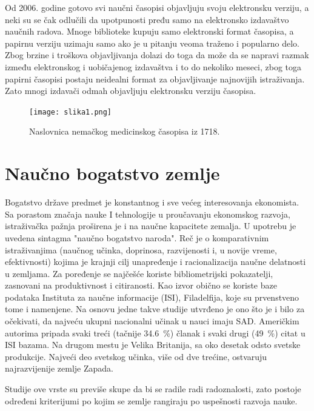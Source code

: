 \documentclass[12pt,a4paper]{article}
\begin{document}
   Od 2006. godine gotovo svi naučni časopisi objavljuju svoju elektronsku verziju, a neki su se čak odlučili da upotpunosti pređu samo na elektronsko izdavaštvo naučnih radova. Mnoge biblioteke kupuju samo elektronski format časopisa, a papirnu verziju uzimaju samo ako je u pitanju veoma traženo i popularno delo. Zbog brzine i troškova objavljivanja dolazi do toga da može da se napravi razmak između elektronskog i uobičajenog izdavaštva i to do nekoliko meseci, zbog toga papirni časopisi postaju neidealni format za objavljivanje najnovijih istraživanja. Zato mnogi izdavači odmah objavljuju elektronsku verziju časopisa. \cite{4}

\begin{figure} [h]
\centering  
\texttt{[image: slika1.png]} 
\caption{ Naslovnica nemačkog medicinskog časopisa iz 1718.}\label{slika1}
\end{figure}  
\newpage

\section{\large\textbf{Naučno bogatstvo zemlje}}
\indent 

    Bogatstvo države predmet je konstantnog i sve većeg interesovanja ekonomista. Sa porastom značaja nauke I tehnologije u proučavanju ekonomskog razvoja, istraživačka pažnja proširena je i na naučne kapacitete zemalja. U upotrebu je uvedena sintagma "naučno bogatstvo naroda". Reč je o komparativnim istraživanjima (naučnog učinka, doprinosa, razvijenosti i, u novije vreme, efektivnosti) kojima je krajnji cilj unapređenje i racionalizacija naučne delatnosti u zemljama. Za poređenje se najčešće koriste bibliometrijski pokazatelji, zasnovani na produktivnost i citiranosti. Kao izvor obično se koriste baze podataka Instituta za naučne informacije (ISI), Filadelfija, koje su prvenstveno tome i namenjene. Na osnovu jedne takve studije utvrđeno je ono što je i bilo za očekivati, da najveću ukupni nacionalni učinak u nauci imaju SAD. Američkim autorima pripada svaki treći (tačnije \SI{34.6}{\percent}) članak i svaki drugi (\SI{49}{\percent}) citat u ISI bazama. Na drugom mestu je Velika Britanija, sa oko desetak odsto svetske produkcije. Najveći deo svetskog učinka, više od dve trećine, ostvaruju najrazvijenije zemlje Zapada.
  
   Studije ove vrste su previše skupe da bi se radile radi radoznalosti, zato postoje određeni kriterijumi po kojim se zemlje rangiraju po uspešnosti razvoja nauke.
   
\end{document}
